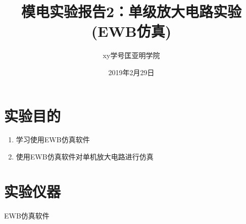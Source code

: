 \documentclass[a4paper]{article}
\title{模电实验报告2：单级放大电路实验(EWB仿真)}
\author{xy\quad 学号\quad 匡亚明学院}
\date{2019年2月29日}
\begin{document}
\maketitle


\section{实验目的}
\begin{enumerate}
\item 学习使用EWB仿真软件
\item 使用EWB仿真软件对单机放大电路进行仿真
\end{enumerate}

\section{实验仪器}
EWB仿真软件
\end{document}
